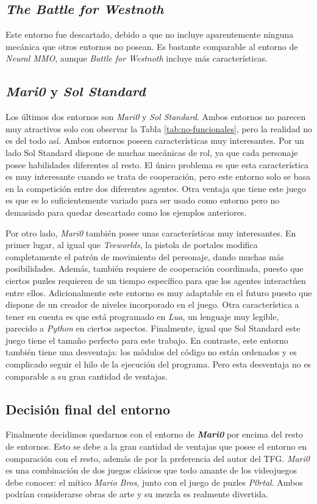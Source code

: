 \subsection{\textit{The Battle for Westnoth}}

Este entorno fue descartado, debido a que no incluye aparentemente ninguna mecánica que otros entornos no posean. Es bastante comparable al entorno de \textit{Neural MMO}, aunque \textit{Battle for  Westnoth} incluye más características.

\subsection{\textit{Mari0} y \textit{Sol Standard}}

Los últimos dos entornos son \textit{Mari0} y \textit{Sol Standard}. Ambos entornos no parecen muy atractivos solo con observar la Tabla \ref{tab:no-funcionales}, pero la realidad no es del todo así. Ambos entornos poseen características muy interesantes. Por un lado Sol Standard dispone de muchas mecánicas de rol, ya que cada personaje posee habilidades diferentes al resto. El único problema es que esta característica es muy interesante cuando se trata de cooperación, pero este entorno solo se basa en la competición entre dos diferentes agentes. Otra ventaja que tiene este juego es que es lo suficientemente variado para ser usado como entorno pero no demasiado para quedar descartado como los ejemplos anteriores.  

Por otro lado, \textit{Mari0} también posee unas características muy interesantes. En primer lugar, al igual que \textit{Teeworlds}, la pistola de portales modifica completamente el patrón de movimiento del personaje, dando muchas más posibilidades. Además, también requiere de cooperación coordinada, puesto que ciertos puzles requieren de un tiempo específico para que los agentes interactúen entre ellos. Adicionalmente este entorno es muy adaptable en el futuro puesto que dispone de un creador de niveles incorporado en el juego. Otra característica a tener en cuenta es que está programado en \textit{Lua}, un lenguaje muy legible, parecido a \textit{Python} en ciertos aspectos. Finalmente, igual que Sol Standard este juego tiene el tamaño perfecto para este trabajo. En contraste, este entorno también tiene una desventaja: los módulos del código no están ordenados y es complicado seguir el hilo de la ejecución del programa. Pero esta desventaja no es comparable a su gran cantidad de ventajas.

\subsection{Decisión final del entorno}

Finalmente decidimos quedarnos con el entorno de \textbf{\textit{Mari0}} por encima del resto de entornos. Esto se debe a la gran cantidad de ventajas que posee el entorno en comparación con el resto, además de por la preferencia del autor del TFG. \textit{Mari0} es una combinación de dos juegos clásicos que todo amante de los videojuegos debe conocer: el mítico \textit{Mario Bros}, junto con el juego de puzles \textit{P0rtal}. Ambos podrían considerarse obras de arte y su mezcla es realmente divertida.
